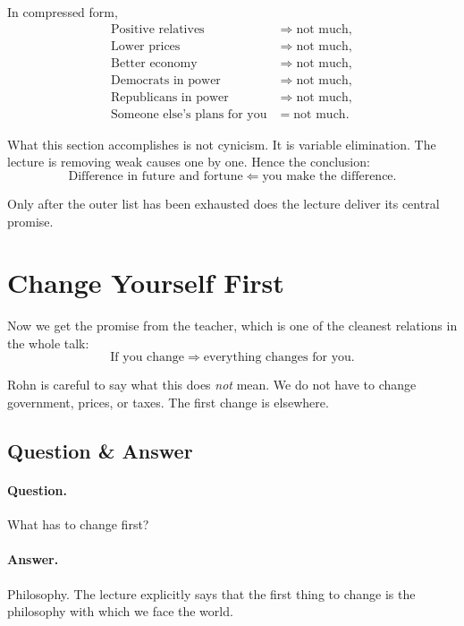 In compressed form,
\begin{align}
\text{Positive relatives} &\Longrightarrow \text{not much},\\
\text{Lower prices} &\Longrightarrow \text{not much},\\
\text{Better economy} &\Longrightarrow \text{not much},\\
\text{Democrats in power} &\Longrightarrow \text{not much},\\
\text{Republicans in power} &\Longrightarrow \text{not much},\\
\text{Someone else's plans for you} &= \text{not much}.
\end{align}

What this section accomplishes is not cynicism. It is variable elimination. The lecture is removing weak causes one by one. Hence the conclusion:
\begin{equation}
\text{Difference in future and fortune} \Longleftarrow \text{you make the difference}.
\end{equation}

Only after the outer list has been exhausted does the lecture deliver its central promise.

\section{Change Yourself First}

Now we get the promise from the teacher, which is one of the cleanest relations in the whole talk:
\begin{equation}
\text{If you change} \Longrightarrow \text{everything changes for you}.
\end{equation}

Rohn is careful to say what this does \emph{not} mean. We do not have to change government, prices, or taxes. The first change is elsewhere.

\subsection{Question \& Answer}

\paragraph{Question.} What has to change first?

\paragraph{Answer.} Philosophy. The lecture explicitly says that the first thing to change is the philosophy with which we face the world.

